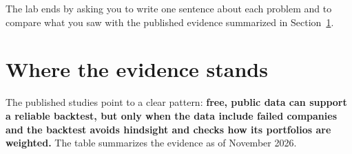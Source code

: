 
The lab ends by asking you to write one sentence about each problem and to compare what you saw with the published evidence summarized in Section~\ref{sec:02-verdict}.

\section{Where the evidence stands}
\label{sec:02-verdict}

The published studies point to a clear pattern: \textbf{free, public data can support a reliable backtest, but only when the data include failed companies and the backtest avoids hindsight and checks how its portfolios are weighted.} The table summarizes the evidence as of November 2026.

